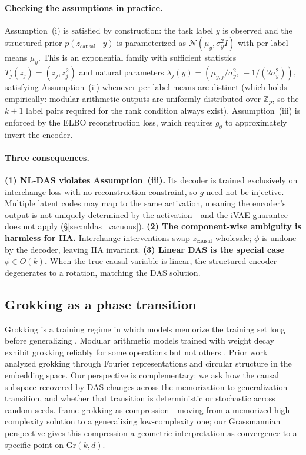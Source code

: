 \documentclass{article}
\newcommand{\Gr}{\mathrm{Gr}}
\newcommand{\Z}{\mathbb{Z}}
\begin{document}
\paragraph{Checking the assumptions in practice.}
Assumption~(i) is satisfied by construction: the task label $y$ is
observed and the structured prior $p(z_\text{causal} \mid y)$ is
parameterized as $\mathcal{N}(\mu_y, \sigma_y^2 I)$ with per-label means
$\mu_y$.  This is an exponential family with sufficient statistics
$T_j(z_j) = (z_j, z_j^2)$ and natural parameters
$\lambda_j(y) = (\mu_{y,j}/\sigma_y^2,\, -1/(2\sigma_y^2))$, satisfying
Assumption~(ii) whenever per-label means are distinct (which holds
empirically: modular arithmetic outputs are uniformly distributed over
$\Z_p$, so the $k{+}1$ label pairs required for the rank condition
always exist).  Assumption~(iii) is enforced by the ELBO reconstruction
loss, which requires $g_\theta$ to approximately invert the encoder.

\paragraph{Three consequences.}
\textbf{(1) NL-DAS violates Assumption~(iii).}
Its decoder is trained exclusively on interchange loss with no reconstruction
constraint, so $g$ need not be injective.  Multiple latent codes may map to
the same activation, meaning the encoder's output is not uniquely determined
by the activation---and the iVAE guarantee does not apply
(\S\ref{sec:nldas_vacuous}).
\textbf{(2) The component-wise ambiguity is harmless for IIA.}
Interchange interventions swap $z_\text{causal}$ wholesale; $\phi$ is undone
by the decoder, leaving IIA invariant.
\textbf{(3) Linear DAS is the special case $\phi \in O(k)$.}
When the true causal variable is linear, the structured encoder degenerates
to a rotation, matching the DAS solution.

\subsection{Grokking as a phase transition}

Grokking is a training regime in which models memorize the training set long
before generalizing \citep{power2022grokking}. Modular arithmetic models trained
with weight decay exhibit grokking reliably for some operations but not others
\citep{nanda2023progress, zhong2024clock}. Prior work analyzed grokking through
Fourier representations and circular structure in the embedding space. Our
perspective is complementary: we ask how the causal subspace recovered by DAS
changes across the memorization-to-generalization transition, and whether that
transition is deterministic or stochastic across random seeds.
\citet{liu2023grokking} frame grokking as compression---moving from a memorized
high-complexity solution to a generalizing low-complexity one; our Grassmannian
perspective gives this compression a geometric interpretation as convergence to a
specific point on $\Gr(k,d)$.
\end{document}
